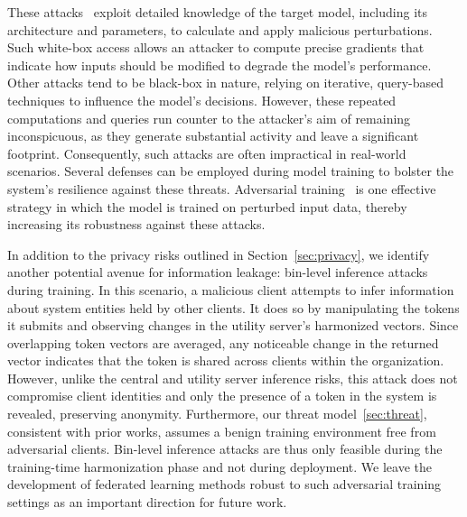  These attacks~\cite{chakraborty2021survey} exploit detailed knowledge of the target model, including its architecture and parameters, to calculate and apply malicious perturbations. Such white-box access allows an attacker to compute precise gradients that indicate how inputs should be modified to degrade the model’s performance. Other attacks tend to be black-box in nature, relying on iterative, query-based techniques to influence the model’s decisions. However, these repeated computations and queries run counter to the attacker’s aim of remaining inconspicuous, as they generate substantial activity and leave a significant footprint. Consequently, such attacks are often impractical in real-world scenarios. Several defenses can be employed during model training to bolster the system’s resilience against these threats. Adversarial training~\cite{tramer2019adversarial} is one effective strategy in which the model is trained on perturbed input data, thereby increasing its robustness against these attacks.

In addition to the privacy risks outlined in Section~\ref{sec:privacy}, we identify another potential avenue for information leakage: bin-level inference attacks during training. In this scenario, a malicious client attempts to infer information about system entities held by other clients. It does so by manipulating the tokens it submits and observing changes in the utility server's harmonized vectors. Since overlapping token vectors are averaged, any noticeable change in the returned vector indicates that the token is shared across clients within the organization.  However, unlike the central and utility server inference risks, this attack does not compromise client identities and only the presence of a token in the system is revealed, preserving anonymity. Furthermore, our threat model~\ref{sec:threat}, consistent with prior \pids works, assumes a benign training environment free from adversarial clients. Bin-level inference attacks are thus only feasible during the training-time harmonization phase and not during deployment. We leave the development of federated learning methods robust to such adversarial training settings as an important direction for future work.
